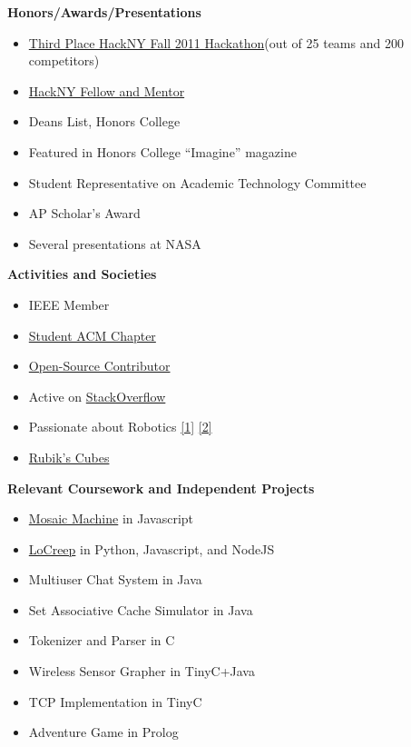 \documentclass[letterpaper,11pt]{article}
\newcommand{\resitem}[1]{\item #1 \vspace{-2pt}}
\newcommand{\resheading}[1]{{\large \colorbox{mygrey}{\begin{minipage}{\textwidth}{\textbf{#1 \vphantom{p\^{E}}}}\end{minipage}}}}
\begin{document}
\resheading{Honors/Awards/Presentations}
\begin{itemize}
   \resitem{\href{http://www.youtube.com/watch?v=ga6RPRAFRUY}{Third Place HackNY Fall 2011 Hackathon}(out of 25 teams and 200 competitors)}
   \resitem{\href{http://hackny.org/a/about/}{HackNY Fellow and Mentor}}
   \resitem{Deans List, Honors College}
   \resitem{Featured in Honors College ``Imagine'' magazine}
   \resitem{Student Representative on Academic Technology Committee}
   \resitem{AP Scholar's Award}
   \resitem{Several presentations at NASA}
\end{itemize}
\resheading{Activities and Societies}
\begin{itemize}
   \resitem{IEEE Member}
   \resitem{\href{http://polaris.cs.wcu.edu/~acm/}{Student ACM Chapter}}
   \resitem{\href{https://github.com/ranman}{Open-Source Contributor}}
   \resitem{Active on \href{http://stackoverflow.com/users/240004/ranman}{StackOverflow}}
   \resitem{Passionate about Robotics
      \href{http://robotics.punahou.edu/}{[1]}
      \href{http://irg.arc.nasa.gov}{[2]}}
   \resitem{\href{http://www.youtube.com/user/ranman96734}{Rubik's Cubes}}
\end{itemize}
\resheading{Relevant Coursework and Independent Projects}
\begin{itemize}
   \resitem{\href{http://www.mosaicmachine.com/}{Mosaic Machine} in Javascript}
   \resitem{\href{http://www.locreep.com/}{LoCreep} in Python, Javascript, and NodeJS}
   \resitem{Multiuser Chat System in Java}
   \resitem{Set Associative Cache Simulator in Java}
   \resitem{Tokenizer and Parser in C}
   \resitem{Wireless Sensor Grapher in TinyC+Java}
   \resitem{TCP Implementation in TinyC}
   \resitem{Adventure Game in Prolog}
\end{itemize}
\end{document}
